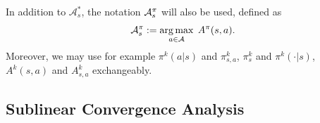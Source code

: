 In addition to $\mathcal{A}_s^*$, the notation ${\cal A}^\pi_s$ will also be used, defined as 
\begin{align*}
    {\cal A}^\pi_s := \operatorname*{arg\,max}_{a\in{\cal A}} \; A^\pi(s,a).
\end{align*}
Moreover,  we may use for example $\pi^k(a|s)$ and $\pi^k_{s,a}$, $\pi^k_s$ and $\pi^k(\cdot|s)$, $A^k(s,a)$ and $A^k_{s,a}$ exchangeably.  

\subsection{Sublinear Convergence Analysis}

